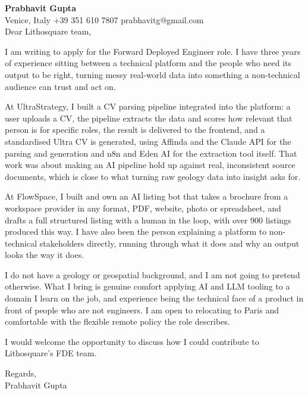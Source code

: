 \documentclass[a4paper,10.5pt]{article}
\begin{document}
\textbf{Prabhavit Gupta}\\
Venice, Italy \textbar{} +39 351 610 7807 \textbar{} prabhavitg@gmail.com\\[10pt]
Dear Lithosquare team,

I am writing to apply for the Forward Deployed Engineer role. I have three years of experience sitting between a technical platform and the people who need its output to be right, turning messy real-world data into something a non-technical audience can trust and act on.

At UltraStrategy, I built a CV parsing pipeline integrated into the platform: a user uploads a CV, the pipeline extracts the data and scores how relevant that person is for specific roles, the result is delivered to the frontend, and a standardised Ultra CV is generated, using Affinda and the Claude API for the parsing and generation and n8n and Eden AI for the extraction tool itself. That work was about making an AI pipeline hold up against real, inconsistent source documents, which is close to what turning raw geology data into insight asks for.

At FlowSpace, I built and own an AI listing bot that takes a brochure from a workspace provider in any format, PDF, website, photo or spreadsheet, and drafts a full structured listing with a human in the loop, with over 900 listings produced this way. I have also been the person explaining a platform to non-technical stakeholders directly, running through what it does and why an output looks the way it does.

I do not have a geology or geospatial background, and I am not going to pretend otherwise. What I bring is genuine comfort applying AI and LLM tooling to a domain I learn on the job, and experience being the technical face of a product in front of people who are not engineers. I am open to relocating to Paris and comfortable with the flexible remote policy the role describes.

I would welcome the opportunity to discuss how I could contribute to Lithosquare's FDE team.

Regards,\\
Prabhavit Gupta
\end{document}
